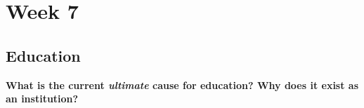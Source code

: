 \documentclass[12pt,a4paper]{article}
\begin{document}
\tableofcontents
\cleardoublepage
\fancyhead{}

\clearpage
\section*{Week 7}
{}

\subsection{Education}
\textbf{What is the current \textit{ultimate} cause for education? Why does it exist as an institution? }
\end{document}
